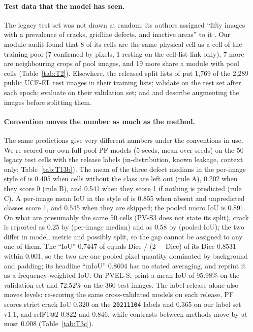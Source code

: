 \paragraph{Test data that the model has seen.} The legacy test set was not drawn at random: its authors assigned ``fifty
images with a prevalence of cracks, gridline defects, and inactive areas'' to it \citep{pratt2023benchmark}. Our module audit
found that 8 of its cells are the same physical cell as a cell of the training pool (7 confirmed by pixels, 1 resting on the
cell-list link only), 7 more are neighbouring crops of pool images, and 19 more share a module with pool cells
(Table~\ref{tab:T2}). Elsewhere, the released split lists of \citet{jha2025pvs3} put 1,769 of the 2,289 public UCF-EL test
images in their training lists; \citet{fioresi2022ucfel} validate on the test set after each epoch; \citet{duan2025caak}
evaluate on their validation set; and \citet{sanghi2026multisolsegment} and \citet{saleh2026anomaly} describe augmenting the
images before splitting them.

\paragraph{Convention moves the number as much as the method.} The same predictions give very different numbers under the
conventions in use. We re-scored our own full-pool PF models (5 seeds, mean over seeds) on the 50 legacy test cells with the
release labels (in-distribution, known leakage, context only; Table~\ref{tab:T13b}). The mean of the three defect medians in
the per-image style of \citet{pratt2023benchmark} is 0.405 when cells without the class are left out (rule A), 0.202 when they
score 0 (rule B), and 0.541 when they score 1 if nothing is predicted (rule C). A per-image mean IoU in the style of
\citet{eesaar2023seipv} is 0.855 when absent and unpredicted classes score 1, and 0.545 when they are skipped; the pooled micro
IoU is 0.891. On what are presumably the same 50 cells (PV-S3 does not state its split), crack is reported as 0.25 by
\citet{pratt2023benchmark} (per-image median) and as 0.58 by \citet{jha2025pvs3} (pooled IoU); the two
differ in model, metric and possibly split, so the gap cannot be assigned to any one of them. The ``IoU'' 0.7447 of \citet{eesaar2023seipv} equals
Dice / (2 $-$ Dice) of its Dice 0.8531 within 0.001, so the two are one pooled pixel quantity dominated by background and
padding; its headline ``mIoU'' 0.8604 has no stated averaging, and \citet{ramadan2026hybrid} reprint it as a
frequency-weighted IoU. On PVEL-S, \citet{gunasekara2026stcnet} print a mean IoU of 95.98\% on the validation
set and 72.52\% on the 360 test images. The label release alone also moves levels: re-scoring
the same cross-validated models on each release, PF scores strict crack IoU 0.320 on the \texttt{20211104} labels and 0.365
on our label set v1.1, and relF1@2 0.822 and 0.846, while contrasts between methods move by at most 0.008
(Table~\ref{tab:T3c}).

